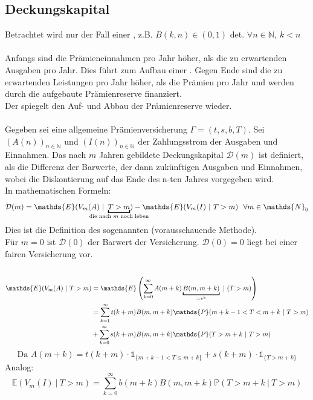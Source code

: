 \subsection{Deckungskapital}
\label{sub:deckungskapital}
Betrachtet wird nur der Fall einer , z.B. $B(k,n) \in (0,1)$ det. $\forall n \in \mathds{N},~k<n$\\
\\
Anfangs sind die Prämieneinnahmen pro Jahr höher, als die zu erwartenden Ausgaben pro Jahr. 
Dies führt zum Aufbau einer . 
Gegen Ende sind die zu erwartenden Leistungen pro Jahr höher, als die Prämien pro Jahr und werden durch die aufgebaute Prämienreserve finanziert.\\
Der  spiegelt den Auf- und Abbau der Prämienreserve wieder.\\
\\
Gegeben sei eine allgemeine Prämienversicherung $\Gamma=(t,s,b,T)$.
Sei $(A(n))_{n\in \mathds{N}}$ und $(I(n))_{n\in \mathds{N}}$ der Zahlungsstrom der Ausgaben und Einnahmen. 
Das nach $m$ Jahren gebildete Deckungskapital $\mathcal{D}(m)$ ist definiert, als die Differenz der Barwerte, der dann zukünftigen Ausgaben und Einnahmen, wobei die Diskontierung auf das Ende des n-ten Jahres vorgegeben wird.\\
In mathematischen Formeln: 
\[
\mathcal{D}(m)= \mathds{E}(V_m(A)~|~\underbracket{T>m}_{\mathclap{\text{die nach $m$ noch leben}}})- \mathds{E}(V_m(I)~|~T>m) ~~ \forall m\in \mathds{N}_0 
\]
Dies ist die Definition des sogenannten  (vorausschauende Methode).\\
Für $m=0$ ist $\mathcal{D}(0)$ der Barwert der Versicherung. 
$\mathcal{D}(0)=0$ liegt bei einer fairen Versicherung vor.\\
\\
\begin{equation*}
\begin{aligned}
	\mathds{E}(V_m(A)~|~T>m) &= \mathds{E}\enbrace{\sum_{k=0}^{\infty}A(m+k)\underbracket{B(m,m+k)}_{=v^k}~|~(T>m)}\\
	&= \sum_{k=1}^{\infty}t(k+m)B(m,m+k) \mathds{P}(m+k-1<T<m+k~|~T>m)\\
	&+ \sum_{k=0}^{\infty}s(k+m)B(m,m+k) \mathds{P}(T>m+k~|~T>m)	
\end{aligned}
\end{equation*}
\[
\text{Da } A(m+k) = t(k+m)\cdot \mathbb{1}_{\{m+k-1<T \le m+k \}} + s(k+m)\cdot \mathbb{1}_{\{T>m+k \}}
\]
Analog:
\[
\mathds{E}(V_m(I)~|~T>m)= \sum_{k=0}^{\infty}b(m+k)B(m,m+k) \mathds{P}(T>m+k~|~T>m) 
\]

